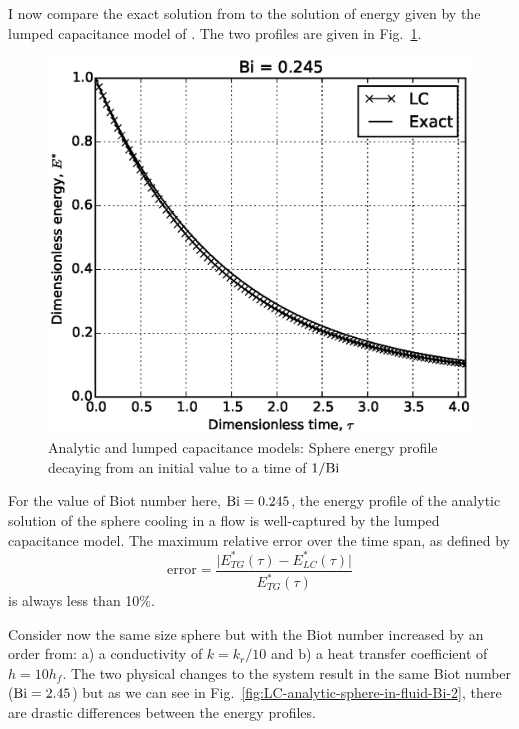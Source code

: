 I now compare the exact solution from  to the solution of energy given by the lumped capacitance model of . The two profiles are given in Fig.~\ref{fig:LC-analytic-sphere-in-fluid}. 

\begin{figure}[ht]
	\centering
		\includegraphics[width=\singleimagewidth]{figures/LC-analytic-sphere-in-fluid}
	\caption[Analytic temperature profile for $\Bi < 1$]{Analytic and lumped capacitance models: Sphere energy profile decaying from an initial value to a time of $1/\mathrm{Bi}$}
	\label{fig:LC-analytic-sphere-in-fluid}
\end{figure}

For the value of Biot number here, $\mathrm{Bi} = 0.245$, the energy profile of the analytic solution of the sphere cooling in a flow is well-captured by the lumped capacitance model. The maximum relative error over the time span, as defined by
\begin{equation}\label{eq:error}
	\text{error} = \frac{\big|E^*_{TG}(\tau) - E^*_{LC}(\tau) \big|}{E^*_{TG}(\tau)}
\end{equation}
is always less than 10\%. 

Consider now the same size sphere but with the Biot number increased by an order from: a) a conductivity of $k = k_r/10$ and b) a heat transfer coefficient of $h = 10h_f$. The two physical changes to the system result in the same Biot number ($\mathrm{Bi} = 2.45$) but as we can see in Fig.~\ref{fig:LC-analytic-sphere-in-fluid-Bi-2}, there are drastic differences between the energy profiles.

